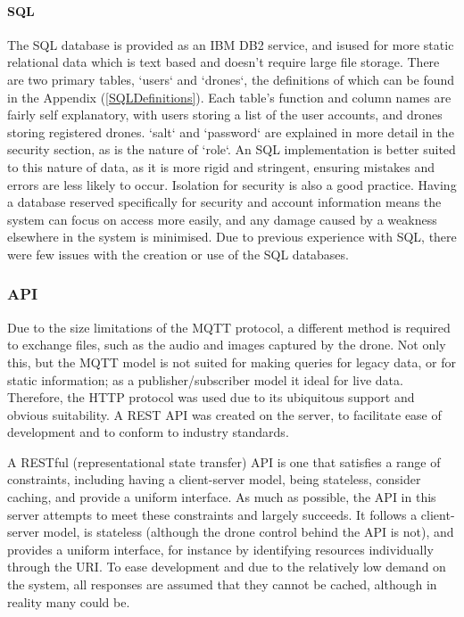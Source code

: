 \documentclass{article}
\begin{document}
\paragraph{SQL} \label{SQL}
The SQL database is provided as an IBM DB2 service, and isused for more static relational data which is text based and doesn't require large file storage. There are two primary tables, `users` and `drones`, the definitions of which can be found in the Appendix (\ref{SQLDefinitions}). Each table's function and column names are fairly self explanatory, with users storing a list of the user accounts, and drones storing registered drones. `salt` and `password` are explained in more detail in the security section, as is the nature of `role`. An SQL implementation is better suited to this nature of data, as it is more rigid and stringent, ensuring mistakes and errors are less likely to occur. Isolation for security is also a good practice. Having a database reserved specifically for security and account information means the system can focus on access more easily, and any damage caused by a weakness elsewhere in the system is minimised. Due to previous experience with SQL, there were few issues with the creation or use of the SQL databases. 

\subsubsection{API} \label{API}
Due to the size limitations of the MQTT protocol, a different method is required to exchange files, such as the audio and images captured by the drone. Not only this, but the MQTT model is not suited for making queries for legacy data, or for static information; as a publisher/subscriber model it ideal for live data. Therefore, the HTTP protocol was used due to its ubiquitous support and obvious suitability. A REST API was created on the server, to facilitate ease of development and to conform to industry standards. 

A RESTful (representational state transfer) API is one that satisfies a range of constraints, including having a client-server model, being stateless, consider caching, and provide a uniform interface. As much as possible, the API in this server attempts to meet these constraints and largely succeeds. It follows a client-server model, is stateless (although the drone control behind the API is not), and provides a uniform interface, for instance by identifying resources individually through the URI. To ease development and due to the relatively low demand on the system, all responses are assumed that they cannot be cached, although in reality many could be. 
\end{document}
